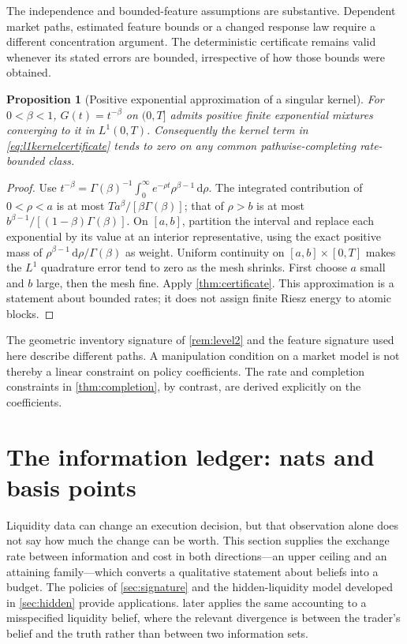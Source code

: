 \documentclass[11pt]{article}
\numberwithin{equation}{section}
\newtheorem{proposition}[theorem]{Proposition}
\theoremstyle{definition}
\theoremstyle{remark}
\theoremstyle{definition}
\newcommand{\dd}{\,\mathrm d}
\begin{document}
The independence and bounded-feature assumptions are substantive. Dependent
market paths, estimated feature bounds or a changed response law require a
different concentration argument. The deterministic certificate remains valid
whenever its stated errors are bounded, irrespective of how those bounds were
obtained.

\begin{proposition}[Positive exponential approximation of a singular kernel]\label{prop:rieszapprox}
For $0<\beta<1$, $G(t)=t^{-\beta}$ on $(0,T]$ admits positive finite
exponential mixtures converging to it in $L^1(0,T)$. Consequently the kernel
term in \eqref{eq:l1kernelcertificate} tends to zero on any common
pathwise-completing rate-bounded class.
\end{proposition}
\begin{proof}
Use $t^{-\beta}=\Gamma(\beta)^{-1}\int_0^\infty
e^{-\rho t}\rho^{\beta-1}\dd\rho$. The integrated contribution of
$0<\rho<a$ is at most $Ta^\beta/[\beta\Gamma(\beta)]$; that of
$\rho>b$ is at most $b^{\beta-1}/[(1-\beta)\Gamma(\beta)]$.
On $[a,b]$, partition the interval and replace each exponential by its value
at an interior representative, using the exact positive mass of
$\rho^{\beta-1}\dd\rho/\Gamma(\beta)$ as weight. Uniform continuity on
$[a,b]\times[0,T]$ makes the $L^1$ quadrature error tend to zero as the mesh
shrinks. First choose $a$ small and $b$ large, then the mesh fine. Apply
\cref{thm:certificate}. This approximation is a statement about bounded
rates; it does not assign finite Riesz energy to atomic blocks.
\end{proof}

The geometric inventory signature of \cref{rem:level2} and the feature
signature used here describe different paths. A manipulation condition on a
market model is not thereby a linear constraint on policy coefficients.
The rate and completion constraints in \cref{thm:completion}, by contrast,
are derived explicitly on the coefficients.

\section{The information ledger: nats and basis points}\label{sec:information_ledger}

Liquidity data can change an execution decision, but that observation alone
does not say how much the change can be worth. This section supplies the
exchange rate between information and cost in both directions---an upper
ceiling and an attaining family---which converts a qualitative statement
about beliefs into a budget. The policies of \cref{sec:signature} and the
hidden-liquidity model developed in \cref{sec:hidden} provide applications.
 later applies the same accounting to a misspecified
liquidity belief, where the relevant divergence is between the trader's
belief and the truth rather than between two information sets.
\end{document}
